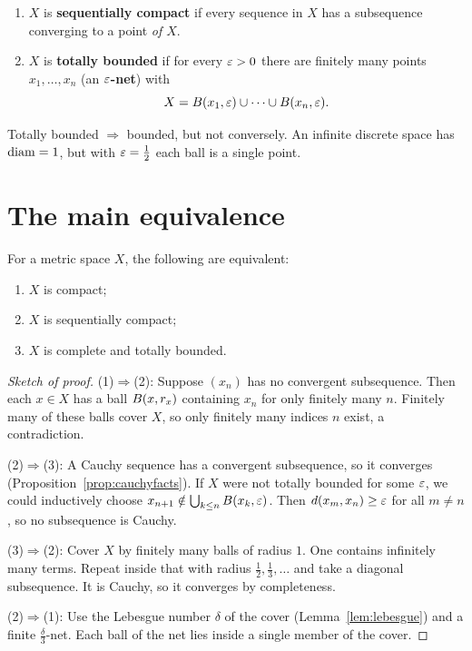 \begin{definition}\label{def:seqcpt}
\leavevmode
\begin{enumerate}[label=(\roman*)]
  \item $X$ is \textbf{sequentially compact} if every sequence in $X$ has a subsequence converging to a point \emph{of $X$}.
  \item $X$ is \textbf{totally bounded} if for every $\varepsilon>0$ there are finitely many points $x_1,\dots,x_n$ (an \textbf{$\varepsilon$-net}) with
  \[ X=B(x_1,\varepsilon)\cup\dots\cup B(x_n,\varepsilon). \]
\end{enumerate}
\end{definition}
Totally bounded $\Rightarrow$ bounded, but not conversely. An infinite discrete space has $\operatorname{diam}=1$, but with $\varepsilon=\frac12$ each ball is a single point.

\section{The main equivalence}
\begin{theorem}\label{thm:cpt-equiv}
For a metric space $X$, the following are equivalent:
\begin{enumerate}[label=(\arabic*)]
  \item $X$ is compact;
  \item $X$ is sequentially compact;
  \item $X$ is complete and totally bounded.
\end{enumerate}
\end{theorem}
\begin{proof}[Sketch of proof]
(1)$\Rightarrow$(2): Suppose $(x_n)$ has no convergent subsequence. Then each $x\in X$ has a ball $B(x,r_x)$ containing $x_n$ for only finitely many $n$. Finitely many of these balls cover $X$, so only finitely many indices $n$ exist, a contradiction.

(2)$\Rightarrow$(3): A Cauchy sequence has a convergent subsequence, so it converges (Proposition~\ref{prop:cauchyfacts}). If $X$ were not totally bounded for some $\varepsilon$, we could inductively choose $x_{n+1}\notin\bigcup_{k\le n}B(x_k,\varepsilon)$. Then $d(x_m,x_n)\ge\varepsilon$ for all $m\ne n$, so no subsequence is Cauchy.

(3)$\Rightarrow$(2): Cover $X$ by finitely many balls of radius $1$. One contains infinitely many terms. Repeat inside that with radius $\frac12,\frac13,\dots$ and take a diagonal subsequence. It is Cauchy, so it converges by completeness.

(2)$\Rightarrow$(1): Use the Lebesgue number $\delta$ of the cover (Lemma~\ref{lem:lebesgue}) and a finite $\frac\delta3$-net. Each ball of the net lies inside a single member of the cover.
\end{proof}

